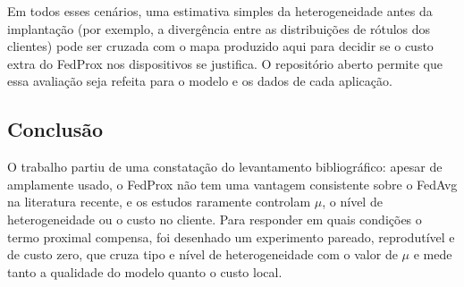 Em todos esses cenários, uma estimativa simples da heterogeneidade antes da implantação (por exemplo, a divergência entre as distribuições de rótulos dos clientes) pode ser cruzada com o mapa produzido aqui para decidir se o custo extra do FedProx nos dispositivos se justifica. O repositório aberto permite que essa avaliação seja refeita para o modelo e os dados de cada aplicação.

\subsection{Conclusão}

O trabalho partiu de uma constatação do levantamento bibliográfico: apesar de amplamente usado, o FedProx não tem uma vantagem consistente sobre o FedAvg na literatura recente, e os estudos raramente controlam $\mu$, o nível de heterogeneidade ou o custo no cliente. Para responder em quais condições o termo proximal compensa, foi desenhado um experimento pareado, reprodutível e de custo zero, que cruza tipo e nível de heterogeneidade com o valor de $\mu$ e mede tanto a qualidade do modelo quanto o custo local. 
